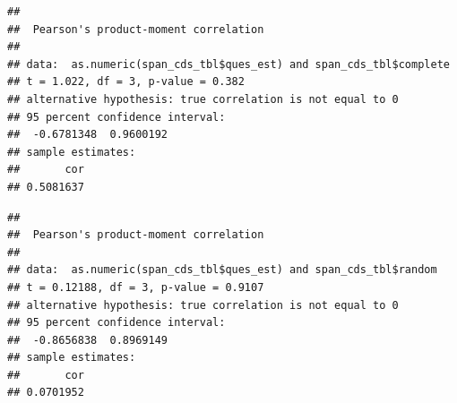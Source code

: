 \documentclass[
]{article}
\newenvironment{Shaded}{\begin{snugshade}}{\end{snugshade}}
\newcommand{\CharTok}[1]{\textcolor[rgb]{0.31,0.60,0.02}{#1}}
\newcommand{\CommentTok}[1]{\textcolor[rgb]{0.56,0.35,0.01}{\textit{#1}}}
\newcommand{\DataTypeTok}[1]{\textcolor[rgb]{0.13,0.29,0.53}{#1}}
\newcommand{\DecValTok}[1]{\textcolor[rgb]{0.00,0.00,0.81}{#1}}
\newcommand{\KeywordTok}[1]{\textcolor[rgb]{0.13,0.29,0.53}{\textbf{#1}}}
\newcommand{\NormalTok}[1]{#1}
\newcommand{\OperatorTok}[1]{\textcolor[rgb]{0.81,0.36,0.00}{\textbf{#1}}}
\newcommand{\OtherTok}[1]{\textcolor[rgb]{0.56,0.35,0.01}{#1}}
\newcommand{\StringTok}[1]{\textcolor[rgb]{0.31,0.60,0.02}{#1}}
\begin{document}
\begin{verbatim}
## 
##  Pearson's product-moment correlation
## 
## data:  as.numeric(span_cds_tbl$ques_est) and span_cds_tbl$complete
## t = 1.022, df = 3, p-value = 0.382
## alternative hypothesis: true correlation is not equal to 0
## 95 percent confidence interval:
##  -0.6781348  0.9600192
## sample estimates:
##       cor 
## 0.5081637
\end{verbatim}

\begin{Shaded}
\end{Shaded}

\begin{verbatim}
## 
##  Pearson's product-moment correlation
## 
## data:  as.numeric(span_cds_tbl$ques_est) and span_cds_tbl$random
## t = 0.12188, df = 3, p-value = 0.9107
## alternative hypothesis: true correlation is not equal to 0
## 95 percent confidence interval:
##  -0.8656838  0.8969149
## sample estimates:
##       cor 
## 0.0701952
\end{verbatim}

\begin{Shaded}
\end{Shaded}
\end{document}

